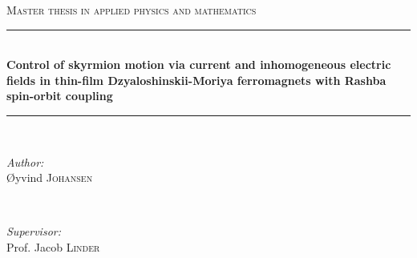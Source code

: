 \documentclass[12pt, a4paper, twoside, openright]{report}
\numberwithin{equation}{chapter}
\numberwithin{figure}{chapter}
\numberwithin{table}{chapter}
\begin{document}
\begin{titlepage}

\newcommand{\HRule}{\rule{\linewidth}{0.5mm}} %

\center %
 

\textsc{\Large Master thesis in applied physics and mathematics}\\[0.5cm] %


\HRule \\[0.4cm]
{ \huge \bfseries Control of skyrmion motion via current and inhomogeneous electric fields in thin-film Dzyaloshinskii-Moriya ferromagnets with Rashba spin-orbit coupling}\\[0.4cm]
\HRule \\[1.5cm]
 

\begin{minipage}{0.4\textwidth}
\begin{flushleft} \large
\emph{Author:}\\
\O yvind \textsc{Johansen} %
\end{flushleft}
\end{minipage}
~
\begin{minipage}{0.4\textwidth}
\begin{flushright} \large
\emph{Supervisor:} \\
Prof. Jacob \textsc{Linder} %
\end{flushright}
\end{minipage}\\[4cm]


\end{titlepage}
\end{document}
